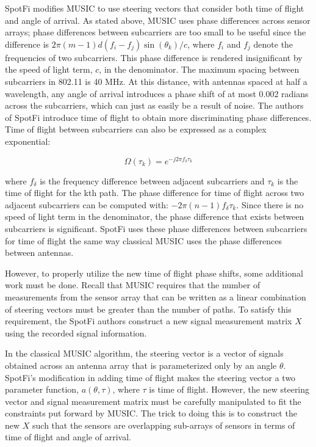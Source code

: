 \documentclass[12pt]{report}
\begin{document}
SpotFi modifies MUSIC to use steering vectors that consider both time of flight and angle of arrival. As stated above, MUSIC uses phase differences across sensor arrays; phase differences between subcarriers are too small to be useful since the difference is $2 \pi (m - 1) d (f_i - f_j) \sin(\theta_k) / c$, where $f_i$ and $f_j$ denote the frequencies of two subcarriers. This phase difference is rendered insignificant by the speed of light term, $c$, in the denominator. The maximum spacing between subcarriers in 802.11 is 40 MHz. At this distance, with antennas spaced at half a wavelength, any angle of arrival introduces a phase shift of at most 0.002 radians across the subcarriers, which can just as easily be a result of noise. The authors of SpotFi introduce time of flight to obtain more discriminating phase differences. Time of flight between subcarriers can also be expressed as a complex exponential:

$$\Omega(\tau_{k}) = e^{-j 2 \pi f_{\delta} \tau_k }$$

where $f_{\delta}$ is the frequency difference between adjacent subcarriers and $\tau_{k}$ is the time of flight for the kth path. The phase difference for time of flight across two adjacent subcarriers can be computed with: $-2 \pi (n - 1) f_{\delta} \tau_k$. Since there is no speed of light term in the denominator,  the phase difference that exists between subcarriers is significant. SpotFi uses these phase differences between subcarriers for time of flight the same way classical MUSIC uses the phase differences between antennas. \par

However, to properly utilize the new time of flight phase shifts, some additional work must be done. Recall that MUSIC requires that the number of measurements from the sensor array that can be written as a linear combination of steering vectors must be greater than the number of paths. To satisfy this requirement, the SpotFi authors construct a new signal measurement matrix $X$ using the recorded signal information. \par

In the classical MUSIC algorithm, the steering vector is a vector of signals obtained across an antenna array that is parameterized only by an angle $\theta$. SpotFi's modification in adding time of flight makes the steering vector a two parameter function, $a(\theta, \tau)$, where $\tau$ is time of flight. However, the new steering vector and signal measurement matrix must be carefully manipulated to fit the constraints put forward by MUSIC. The trick to doing this is to construct the new $X$ such that the sensors are overlapping sub-arrays of sensors in terms of time of flight and angle of arrival. 
\end{document}
